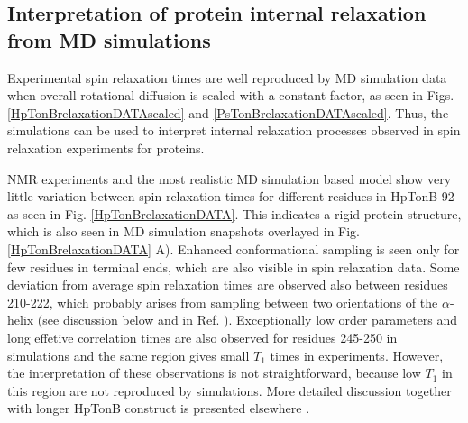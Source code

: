 \documentclass[pre,aps,floatfix,authordate1-4,twocolumn]{revtex4-1}
\begin{document}
\subsection{Interpretation of protein internal relaxation from MD simulations}
Experimental spin relaxation times are well reproduced by MD simulation
data when overall rotational diffusion is scaled with a constant factor,
as seen in Figs. \ref{HpTonBrelaxationDATAscaled} and \ref{PsTonBrelaxationDATAscaled}.
Thus, the simulations can be used to interpret internal relaxation processes
observed in spin relaxation experiments for proteins.

NMR experiments and the most realistic MD simulation
based model show very little variation between spin relaxation times for
different residues in HpTonB-92 as seen in Fig. \ref{HpTonBrelaxationDATA}.
This indicates a rigid protein structure, which is also seen in
MD simulation snapshots overlayed in Fig. \ref{HpTonBrelaxationDATA} A).
Enhanced conformational sampling is seen only for few residues in terminal
ends, which are also visible in spin relaxation data.
Some deviation from average spin relaxation times are observed also
between residues 210-222, which probably arises from sampling between
two orientations of the $\alpha$-helix (see discussion below and in Ref. \cite{??}).
Exceptionally low order parameters and long effetive correlation times
are also observed for residues 245-250 in simulations and the same region
gives small $T_1$ times in experiments. However, the interpretation of
these observations is not straightforward, because low $T_1$ in this region
are not reproduced by simulations. More detailed discussion together with
longer HpTonB construct is presented elsewhere \cite{??}.
\end{document}
